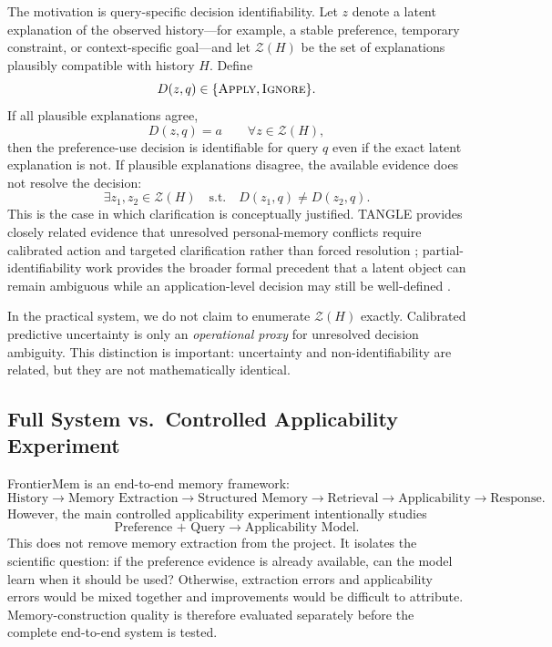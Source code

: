\documentclass[11pt]{article}
\begin{document}
The motivation is query-specific decision identifiability. Let $z$ denote a latent explanation of the observed history---for example, a stable preference, temporary constraint, or context-specific goal---and let $\mathcal{Z}(H)$ be the set of explanations plausibly compatible with history $H$. Define
\[
D(z,q)\in\{\textsc{Apply},\textsc{Ignore}\}.
\]
If all plausible explanations agree,
\[
D(z,q)=a
\qquad
\forall z\in\mathcal{Z}(H),
\]
then the preference-use decision is identifiable for query $q$ even if the exact latent explanation is not. If plausible explanations disagree, the available evidence does not resolve the decision:
\[
\exists z_1,z_2\in\mathcal{Z}(H)
\quad\text{s.t.}\quad
D(z_1,q)\neq D(z_2,q).
\]
This is the case in which clarification is conceptually justified. TANGLE provides closely related evidence that unresolved personal-memory conflicts require calibrated action and targeted clarification rather than forced resolution \cite{yang2026tangle}; partial-identifiability work provides the broader formal precedent that a latent object can remain ambiguous while an application-level decision may still be well-defined \cite{skalse2026partial}.

In the practical system, we do not claim to enumerate $\mathcal{Z}(H)$ exactly. Calibrated predictive uncertainty is only an \emph{operational proxy} for unresolved decision ambiguity. This distinction is important: uncertainty and non-identifiability are related, but they are not mathematically identical.

\subsection{Full System vs.\ Controlled Applicability Experiment}

FrontierMem is an end-to-end memory framework:
\[
\text{History}
\rightarrow
\text{Memory Extraction}
\rightarrow
\text{Structured Memory}
\rightarrow
\text{Retrieval}
\rightarrow
\text{Applicability}
\rightarrow
\text{Response}.
\]
However, the main controlled applicability experiment intentionally studies
\[
\text{Preference + Query}
\rightarrow
\text{Applicability Model}.
\]
This does not remove memory extraction from the project. It isolates the scientific question: if the preference evidence is already available, can the model learn when it should be used? Otherwise, extraction errors and applicability errors would be mixed together and improvements would be difficult to attribute. Memory-construction quality is therefore evaluated separately before the complete end-to-end system is tested.
\end{document}
